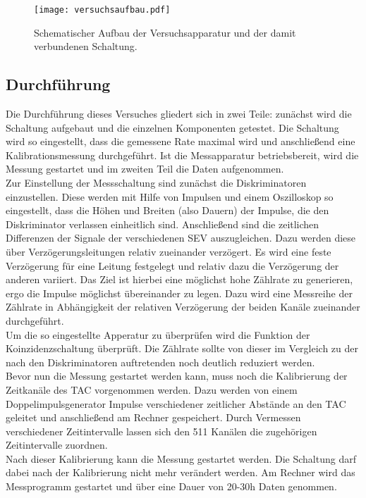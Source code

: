 %
\begin{figure}[htb]
  \centering
  \texttt{[image: versuchsaufbau.pdf]}
  \caption{Schematischer Aufbau der Versuchsapparatur und der damit verbundenen Schaltung. \cite{V01}}
  \label{fig:aufbau}
\end{figure}
%
\subsection{Durchführung}

Die Durchführung dieses Versuches gliedert sich in zwei Teile: zunächst wird die Schaltung aufgebaut und die einzelnen Komponenten getestet. Die Schaltung wird so eingestellt, dass die gemessene Rate maximal wird und anschließend eine Kalibrationsmessung durchgeführt. Ist die Messapparatur betriebsbereit, wird die Messung gestartet und im zweiten Teil die Daten aufgenommen. \\
Zur Einstellung der Messschaltung sind zunächst die Diskriminatoren einzustellen. Diese werden mit Hilfe von Impulsen und einem Oszilloskop so eingestellt, dass die Höhen und Breiten (also Dauern) der Impulse, die den Diskriminator verlassen einheitlich sind. Anschließend sind die zeitlichen Differenzen der Signale der verschiedenen SEV auszugleichen. Dazu werden diese über Verzögerungsleitungen relativ zueinander verzögert. Es wird eine feste Verzögerung für eine Leitung festgelegt und relativ dazu die Verzögerung der anderen variiert. Das Ziel ist hierbei eine möglichst hohe Zählrate zu generieren, ergo die Impulse möglichst übereinander zu legen. Dazu wird eine Messreihe der Zählrate in Abhängigkeit der relativen Verzögerung der beiden Kanäle zueinander durchgeführt. \\
Um die so eingestellte Apperatur zu überprüfen wird die Funktion der Koinzidenzschaltung überprüft. Die Zählrate sollte von dieser im Vergleich zu der nach den Diskriminatoren auftretenden noch deutlich reduziert werden. \\
Bevor nun die Messung gestartet werden kann, muss noch die Kalibrierung der Zeitkanäle des TAC vorgenommen werden. Dazu werden von einem Doppelimpulsgenerator Impulse verschiedener zeitlicher Abstände an den TAC geleitet und anschließend am Rechner gespeichert. Durch Vermessen verschiedener Zeitintervalle lassen sich den 511 Kanälen die zugehörigen Zeitintervalle zuordnen. \\
Nach dieser Kalibrierung kann die Messung gestartet werden. Die Schaltung darf dabei nach der Kalibrierung nicht mehr verändert werden. Am Rechner wird das Messprogramm gestartet und über eine Dauer von 20-30h Daten genommen.
